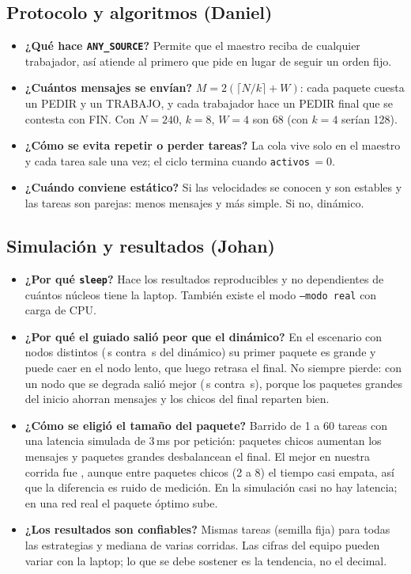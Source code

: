 \documentclass[11pt,a4paper]{article}
\begin{document}
\subsection*{Protocolo y algoritmos (Daniel)}
\begin{itemize}
  \item \textbf{¿Qué hace \texttt{ANY\_SOURCE}?} Permite que el maestro reciba de cualquier trabajador, así atiende al primero que pide en lugar de seguir un orden fijo.
  \item \textbf{¿Cuántos mensajes se envían?} $M=2(\lceil N/k\rceil+W)$: cada paquete cuesta un PEDIR y un TRABAJO, y cada trabajador hace un PEDIR final que se contesta con FIN. Con $N=240$, $k=8$, $W=4$ son 68 (con $k=4$ serían 128).
  \item \textbf{¿Cómo se evita repetir o perder tareas?} La cola vive solo en el maestro y cada tarea sale una vez; el ciclo termina cuando \texttt{activos}\,$=0$.
  \item \textbf{¿Cuándo conviene estático?} Si las velocidades se conocen y son estables y las tareas son parejas: menos mensajes y más simple. Si no, dinámico.
\end{itemize}

\subsection*{Simulación y resultados (Johan)}
\begin{itemize}
  \item \textbf{¿Por qué \texttt{sleep}?} Hace los resultados reproducibles y no dependientes de cuántos núcleos tiene la laptop. También existe el modo \texttt{--modo real} con carga de CPU.
  \item \textbf{¿Por qué el guiado salió peor que el dinámico?} En el escenario con nodos distintos (\tGuiHet\,s contra \tDinHet\,s del dinámico) su primer paquete es grande y puede caer en el nodo lento, que luego retrasa el final. No siempre pierde: con un nodo que se degrada salió mejor (\tGuiDeg\,s contra \tDinDeg\,s), porque los paquetes grandes del inicio ahorran mensajes y los chicos del final reparten bien.
  \item \textbf{¿Cómo se eligió el tamaño del paquete?} Barrido de 1 a 60 tareas con una latencia simulada de 3\,ms por petición: paquetes chicos aumentan los mensajes y paquetes grandes desbalancean el final. El mejor en nuestra corrida fue \chunkMejor, aunque entre paquetes chicos (2 a 8) el tiempo casi empata, así que la diferencia es ruido de medición. En la simulación casi no hay latencia; en una red real el paquete óptimo sube.
  \item \textbf{¿Los resultados son confiables?} Mismas tareas (semilla fija) para todas las estrategias y mediana de varias corridas. Las cifras del equipo pueden variar con la laptop; lo que se debe sostener es la tendencia, no el decimal.
\end{itemize}
\end{document}

